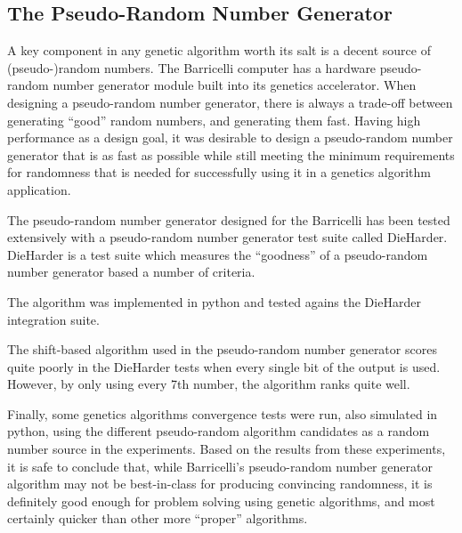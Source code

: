 \subsection{The Pseudo-Random Number Generator}

A key component in any genetic algorithm worth its salt is a decent source of (pseudo-)random numbers.
The Barricelli computer has a hardware pseudo-random number generator module built into its genetics accelerator.
When designing a pseudo-random number generator, there is always a trade-off between generating ``good'' random numbers, and generating them fast.
Having high performance as a design goal\cn, it was desirable to design a pseudo-random number generator that is as fast as possible while still meeting the minimum requirements for randomness that is needed for successfully using it in a genetics algorithm application.

The pseudo-random number generator designed for the Barricelli has been tested extensively with a pseudo-random number generator test suite called DieHarder\cn.
DieHarder is a test suite which measures the ``goodness'' of a pseudo-random number generator based a number of criteria.

The algorithm was implemented in python and tested agains the DieHarder integration suite\cn.

The shift-based algorithm used in the pseudo-random number generator scores quite poorly in the DieHarder tests when every single bit of the output is used.
However, by only using every 7th number\cn, the algorithm ranks quite well.

Finally, some genetics algorithms convergence tests were run, also simulated in python, using the different pseudo-random algorithm candidates as a random number source in the experiments.
Based on the results from these experiments, it is safe to conclude that, while Barricelli's pseudo-random number generator algorithm may not be best-in-class for producing convincing randomness, it is definitely good enough for problem solving using genetic algorithms, and most certainly quicker than other more ``proper'' algorithms.




